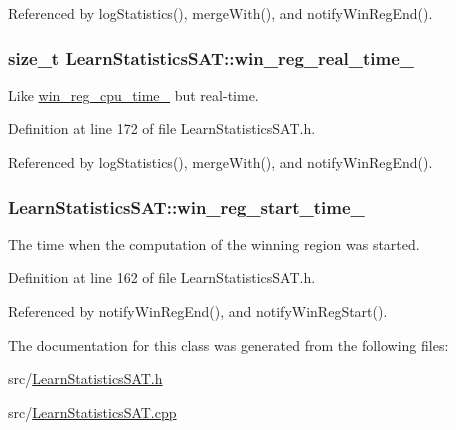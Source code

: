 Referenced by log\-Statistics(), merge\-With(), and notify\-Win\-Reg\-End().

\hypertarget{classLearnStatisticsSAT_a97f7a6ccfc2d6677ae8a6c16dddd6b71}{
\subsubsection[{win\-\_\-reg\-\_\-real\-\_\-time\-\_\-}]{\setlength{\rightskip}{0pt plus 5cm}size\-\_\-t Learn\-Statistics\-S\-A\-T\-::win\-\_\-reg\-\_\-real\-\_\-time\-\_\-\hspace{0.3cm}{\ttfamily [protected]}}}\label{classLearnStatisticsSAT_a97f7a6ccfc2d6677ae8a6c16dddd6b71}


Like \hyperlink{classLearnStatisticsSAT_af9823be5155743223790ae01b91b7ca8}{win\-\_\-reg\-\_\-cpu\-\_\-time\-\_\-} but real-\/time. 



Definition at line 172 of file Learn\-Statistics\-S\-A\-T.\-h.



Referenced by log\-Statistics(), merge\-With(), and notify\-Win\-Reg\-End().

\hypertarget{classLearnStatisticsSAT_a04c8091b3380c8d756d40aabeefbfbe1}{
\subsubsection[{win\-\_\-reg\-\_\-start\-\_\-time\-\_\-}]{ Learn\-Statistics\-S\-A\-T\-::win\-\_\-reg\-\_\-start\-\_\-time\-\_\-\hspace{0.3cm}{\ttfamily [protected]}}}\label{classLearnStatisticsSAT_a04c8091b3380c8d756d40aabeefbfbe1}


The time when the computation of the winning region was started. 



Definition at line 162 of file Learn\-Statistics\-S\-A\-T.\-h.



Referenced by notify\-Win\-Reg\-End(), and notify\-Win\-Reg\-Start().



The documentation for this class was generated from the following files\-:\begin{DoxyCompactItemize}
\item 
src/\hyperlink{LearnStatisticsSAT_8h}{Learn\-Statistics\-S\-A\-T.\-h}\item 
src/\hyperlink{LearnStatisticsSAT_8cpp}{Learn\-Statistics\-S\-A\-T.\-cpp}\end{DoxyCompactItemize}
